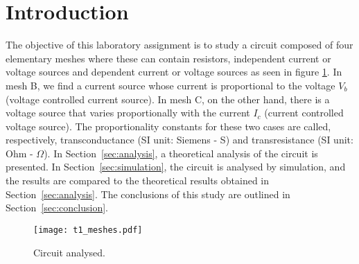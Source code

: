 \newpage
\section{Introduction}
\label{sec:introduction}

The objective of this laboratory assignment is to study a circuit composed of
four elementary meshes where these can contain resistors, independent current or voltage sources
and dependent current or voltage sources as seen in figure
\ref{fig:rc}.
In mesh B, we find a current source whose current is proportional to the voltage $V_{b}$
(voltage controlled current source).
In mesh C, on the other hand, there is a voltage source that varies proportionally
with the current $I_c$ (current controlled voltage source).
The proportionality constants for these two cases are called, respectively,
transconductance (SI unit: Siemens - S) and transresistance (SI unit: Ohm - $\Omega$).
In Section~\ref{sec:analysis}, a theoretical analysis of the circuit is
presented. In Section~\ref{sec:simulation}, the circuit is analysed by
simulation, and the results are compared to the theoretical results obtained in
Section~\ref{sec:analysis}. The conclusions of this study are outlined in
Section~\ref{sec:conclusion}.

\begin{figure}[h] \centering
    \texttt{[image: t1\_meshes.pdf]}
    \caption{Circuit analysed.}
    \label{fig:rc}
\end{figure}

